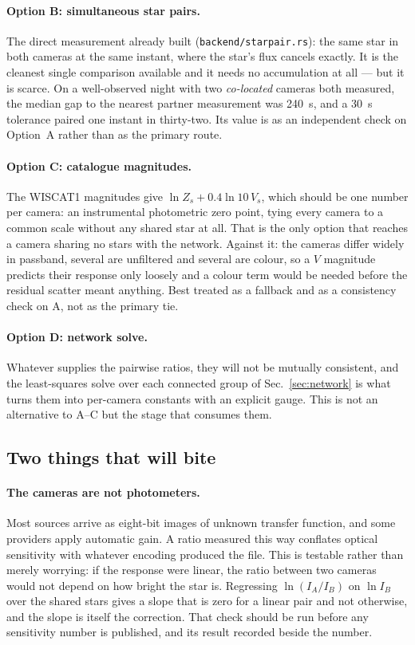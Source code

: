 \documentclass[11pt,a4paper]{article}
\begin{document}
\paragraph{Option B: simultaneous star pairs.} The direct measurement already
built (\texttt{backend/starpair.rs}): the same star in both cameras at the same
instant, where the star's flux cancels exactly. It is the cleanest single
comparison available and it needs no accumulation at all --- but it is scarce.
On a well-observed night with two \emph{co-located} cameras both measured, the
median gap to the nearest partner measurement was \SI{240}{\second}, and a
\SI{30}{\second} tolerance paired one instant in thirty-two. Its value is as an
independent check on Option~A rather than as the primary route.

\paragraph{Option C: catalogue magnitudes.} The WISCAT1 magnitudes give
$\ln Z_s + 0.4\ln 10\,V_s$, which should be one number per camera: an
instrumental photometric zero point, tying every camera to a common scale
without any shared star at all. That is the only option that reaches a camera
sharing no stars with the network. Against it: the cameras differ widely in
passband, several are unfiltered and several are colour, so a $V$ magnitude
predicts their response only loosely and a colour term would be needed before
the residual scatter meant anything. Best treated as a fallback and as a
consistency check on A, not as the primary tie.

\paragraph{Option D: network solve.} Whatever supplies the pairwise ratios,
they will not be mutually consistent, and the least-squares solve over each
connected group of Sec.~\ref{sec:network} is what turns them into per-camera
constants with an explicit gauge. This is not an alternative to A--C but the
stage that consumes them.

\subsection{Two things that will bite}

\paragraph{The cameras are not photometers.} Most sources arrive as
eight-bit images of unknown transfer function, and some providers apply
automatic gain. A ratio measured this way conflates optical sensitivity with
whatever encoding produced the file. This is testable rather than merely
worrying: if the response were linear, the ratio between two cameras would not
depend on how bright the star is. Regressing $\ln(I_A/I_B)$ on $\ln I_B$ over
the shared stars gives a slope that is zero for a linear pair and not otherwise,
and the slope is itself the correction. That check should be run before any
sensitivity number is published, and its result recorded beside the number.
\end{document}
